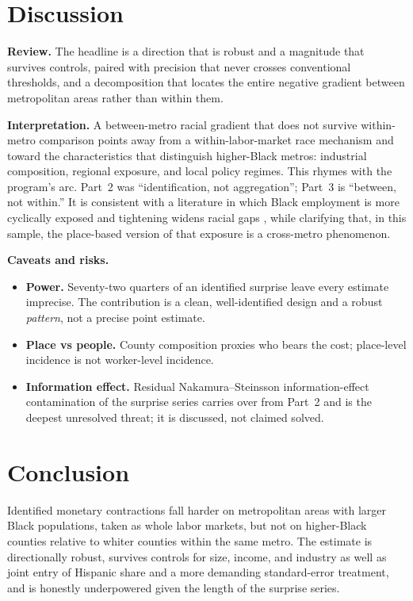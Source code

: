 \documentclass[11pt]{article}
\begin{document}
\section{Discussion}
\textbf{Review.} The headline is a direction that is robust and a magnitude that survives
controls, paired with precision that never crosses conventional thresholds, and a
decomposition that locates the entire negative gradient between metropolitan areas rather than
within them.

\textbf{Interpretation.} A between-metro racial gradient that does not survive within-metro
comparison points away from a within-labor-market race mechanism and toward the characteristics
that distinguish higher-Black metros: industrial composition, regional exposure, and local
policy regimes. This rhymes with the program's arc. Part~2 was ``identification, not
aggregation''; Part~3 is ``between, not within.'' It is consistent with a literature in which
Black employment is more cyclically exposed \citep{CajnerEtAl2017} and tightening widens racial
gaps \citep{CarpenterRodgers2004, SeguinoHeintz2012}, while clarifying that, in this sample,
the place-based version of that exposure is a cross-metro phenomenon.

\textbf{Caveats and risks.}
\begin{itemize}[nosep]
  \item \textbf{Power.} Seventy-two quarters of an identified surprise leave every estimate
        imprecise. The contribution is a clean, well-identified design and a robust
        \emph{pattern}, not a precise point estimate.
  \item \textbf{Place vs people.} County composition proxies who bears the cost; place-level
        incidence is not worker-level incidence.
  \item \textbf{Information effect.} Residual Nakamura--Steinsson information-effect
        contamination of the surprise series \citep{NakamuraSteinsson2018} carries over from
        Part~2 and is the deepest unresolved threat; it is discussed, not claimed solved.
\end{itemize}

\section{Conclusion}
Identified monetary contractions fall harder on metropolitan areas with larger Black
populations, taken as whole labor markets, but not on higher-Black counties relative to whiter
counties within the same metro. The estimate is directionally robust, survives controls for
size, income, and industry as well as joint entry of Hispanic share and a more demanding
standard-error treatment, and is honestly underpowered given the length of the surprise series.
\end{document}
